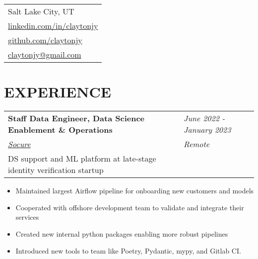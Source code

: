 \documentclass[margin,line]{res}
\begin{document}


\begin{resume}

  \vspace{-.15in}
  \hfill
  \begin{tabular}{l}
    Salt Lake City, UT                                                     \\
    \href{http://www.linkedin.com/in/claytonjy}{linkedin.com/in/claytonjy} \\
    \href{https://github.com/claytonjy}{github.com/claytonjy}              \\
    \href{mailto:claytonjy@gmail.com}{claytonjy@gmail.com}                 \\
  \end{tabular}
  
  
  \section{EXPERIENCE}
  
  \begin{tabular}{p{4.6in} l}
    {\bf Staff Data Engineer, Data Science Enablement \& Operations} & \emph{June 2022 - January 2023} \\
    \href{https://socure.com}{\it Socure}                            & \emph{Remote}                   \\
    DS support and ML platform at late-stage identity verification startup
  \end{tabular}
  \vspace{2pt}
  \begin{itemize}\itemsep -2pt
    \item Maintained largest Airflow pipeline for onboarding new customers and models
    \item Cooperated with offshore development team to validate and integrate their services
    \item Created new internal python packages enabling more robust pipelines
    \item Introduced new tools to team like Poetry, Pydantic, mypy, and Gitlab CI.
  \end{itemize}
  

\end{resume}
\end{document}
